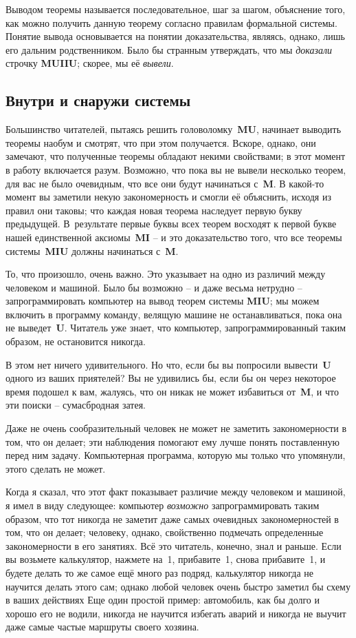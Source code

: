 \documentclass[../main.tex]{subfiles}
\begin{document}
Выводом теоремы называется последовательное, шаг за шагом, объяснение того, как можно получить данную теорему согласно правилам формальной системы. Понятие вывода основывается на понятии доказательства, являясь, однако, лишь его дальним родственником. Было бы странным утверждать, что мы \emph{доказали} строчку \textbf{MUIIU}; скорее, мы её \emph{вывели}.


\subsection{Внутри и снаружи системы}

Большинство читателей, пытаясь решить головоломку~\textbf{MU}, начинает выводить теоремы наобум и смотрят, что при этом получается. Вскоре, однако, они замечают, что полученные теоремы обладают некими свойствами; в этот момент в работу включается разум. Возможно, что пока вы не вывели несколько теорем, для вас не было очевидным, что все они будут начинаться с~\textbf{M}\@. В какой-то момент вы заметили некую закономерность и смогли её объяснить, исходя из правил они таковы; что каждая новая теорема наследует первую букву предыдущей. В~результате первые буквы всех теорем восходят к первой букве нашей единственной аксиомы~\textbf{MI} \--- и это доказательство того, что все теоремы системы~\textbf{MIU} должны начинаться с~\textbf{M}.

То, что произошло, очень важно. Это указывает на одно из различий между человеком и машиной. Было бы возможно \--- и даже весьма нетрудно \--- запрограммировать компьютер на вывод теорем системы \textbf{MIU}; мы можем включить в программу команду, велящую машине не останавливаться, пока она не выведет~\textbf{U}\@. Читатель уже знает, что компьютер, запрограммированный таким образом, не остановится никогда.

В этом нет ничего удивительного. Но что, если бы вы попросили вывести~\textbf{U} одного из ваших приятелей? Вы не удивились бы, если бы он через некоторое время подошел к вам, жалуясь, что он никак не может избавиться от~\textbf{M}, и что эти поиски \--- сумасбродная затея.

Даже не очень сообразительный человек не может не заметить закономерности в том, что он делает; эти наблюдения помогают ему лучше понять поставленную перед ним задачу. Компьютерная программа, которую мы только что упомянули, этого сделать не может.

Когда я сказал, что этот факт показывает различие между человеком и машиной, я имел в виду следующее: компьютер \emph{возможно} запрограммировать таким образом, что тот никогда не заметит даже самых очевидных закономерностей в том, что он делает; человеку, однако, свойственно подмечать определенные закономерности в его занятиях. Всё это читатель, конечно, знал и раньше. Если вы возьмете калькулятор, нажмете на~1, прибавите~1, снова прибавите~1, и будете делать то же самое ещё много раз подряд, калькулятор никогда не научится делать этого сам; однако любой человек очень быстро заметил бы схему в ваших действиях Еще один простой пример: автомобиль, как бы долго и хорошо его не водили, никогда не научится избегать аварий и никогда не выучит даже самые частые маршруты своего хозяина.
\end{document}
